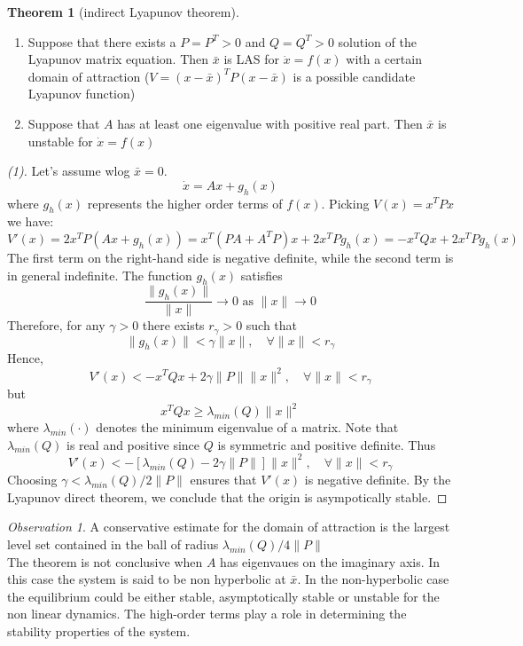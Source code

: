 \documentclass{book}
\theoremstyle{definition}
\newtheorem{theorem}{Theorem}[section]
\theoremstyle{remark}
\theoremstyle{remark}
\newtheorem*{observation}{Observation}
\begin{document}
\begin{theorem}[indirect Lyapunov theorem]
    \begin{enumerate}
        \item Suppose that there exists a $P=P^T>0$ and $Q=Q^T>0$ solution of the Lyapunov matrix equation. Then $\bar{x}$ is LAS for $\dot{x}=f(x)$ with a certain domain of attraction ($V=(x-\bar{x})^TP(x-\bar{x})$ is a possible candidate Lyapunov function)
        \item Suppose that $A$ has at least one eigenvalue with positive real part. Then $\bar{x}$ is unstable for $\dot{x}=f(x)$ 
    \end{enumerate}
\end{theorem}
\begin{proof}[(1)]
    Let's assume wlog $\bar{x}=0$.
    \[
        \dot{x}=Ax+g_h(x)
    \]
    where $g_h(x)$ represents the higher order terms of $f(x)$. Picking $V(x)=x^TPx$ we have:
    \[
        V'(x)=2x^TP(Ax+g_h(x))=x^T(PA+A^TP)x+2x^TPg_h(x)=-x^TQx+2x^TPg_h(x)
    \]
    The first term on the right-hand side is negative definite, while the second term is in general indefinite. The function $g_h(x)$ satisfies
    \[
        \frac{\|g_h(x)\|}{\|x\|}\to 0 \text{ as } \|x\|\to 0 
    \]
    Therefore, for any $\gamma>0$ there exists $r_\gamma>0$ such that
    \[
        \|g_h(x)\|<\gamma\|x\|, \quad \forall \|x\|<r_\gamma
    \]
    Hence,
    \[
        V'(x)<-x^TQx+2\gamma \|P\|\|x\|^2, \quad \forall \|x\|<r_\gamma
    \]
    but
    \[
        x^TQx\geq \lambda_{min}(Q)\|x\|^2
    \]
    where $\lambda_{min}(\cdot)$ denotes the minimum eigenvalue of a matrix. Note that $\lambda_{min}(Q)$ is real and positive since $Q$ is symmetric and positive definite. Thus
    \[
        V'(x)<-\left[ \lambda_{min}(Q)-2\gamma\|P\| \right]\|x\|^2, \quad \forall \|x\|<r_\gamma
    \]
    Choosing $\gamma<\lambda_{min}(Q)/2\|P\|$ ensures that $V'(x)$ is negative definite. By the Lyapunov direct theorem, we conclude that the origin is asympotically stable.
\end{proof}

\begin{observation}
    A conservative estimate for the domain of attraction is the largest level set contained in the ball of radius $\lambda_{min}(Q)/4\|P\|$\\
    The theorem is not conclusive when $A$ has eigenvaues on the imaginary axis. In this case the system is said to be non hyperbolic at $\bar{x}$. In the non-hyperbolic case the equilibrium could be either stable, asymptotically stable or unstable for the non linear dynamics. The high-order terms play a role in determining the stability properties of the system.
\end{observation}
\end{document}
